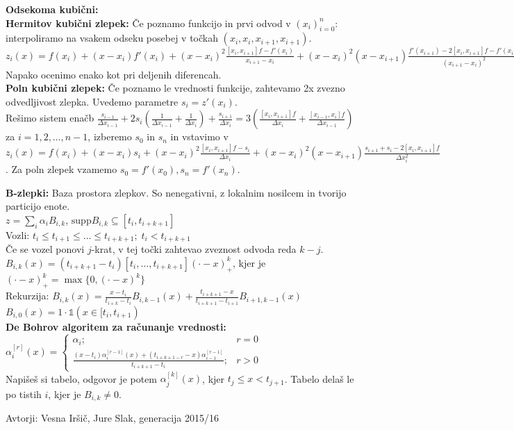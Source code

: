 \documentclass[a4paper,12pt]{article}
\theoremstyle{definition}
\begin{document}
\textbf{Odsekoma kubični:}\\
\textbf{Hermitov kubični zlepek:} Če poznamo funkcijo in prvi odvod v
$(x_i)_{i=0}^n$: interpoliramo na vsakem odseku posebej v
točkah $(x_i, x_i, x_{i+1}, x_{i+1})$.\\
$z_i(x) = f(x_i) + (x-x_i) f'(x_i) + (x-x_i)^2 \frac{[x_i, x_{i+1}]f -
f'(x_i)}{x_{i+1} - x_i} + (x-x_i)^2 (x-x_{i+1}) \frac{f'(x_{i+1}) - 2 [x_i,
x_{i+1}]f - f'(x_i)}{(x_{i+1} - x_i)^2}$\\
Napako ocenimo enako kot pri deljenih diferencah.\\
\textbf{Poln kubični zlepek:} Če poznamo le vrednosti funkcije, zahtevamo 2x
zvezno odvedljivost zlepka. Uvedemo parametre $s_i = z'(x_i)$. \\
Rešimo sistem enačb $\frac{s_{i-1}}{\Delta x_{i-1}} + 2 s_i
\left(\frac{1}{\Delta x_{i-1}} + \frac{1}{\Delta x_i}\right) +
\frac{s_{i+1}}{\Delta x_i} = 3\left(\frac{[x_i, x_{i+1}]f}{\Delta x_i} +
\frac{[x_{i-1}, x_i]f}{\Delta x_{i-1}}\right)$ za $i=1,2,\ldots,n-1$, izberemo
$s_0$ in $s_n$ in vstavimo v $z_i(x) = f(x_i) + (x-x_i)s_i +
(x-x_i)^2\frac{[x_i, x_{i+1}]f - s_i}{\Delta x_i} +
(x-x_i)^2(x-x_{i+1})\frac{s_{i+1} + s_i - 2[x_i, x_{i+1}]f}{\Delta x_i^2}$. Za
poln zlepek vzamemo $s_0 = f'(x_0), s_n = f'(x_n)$.

\textbf{B-zlepki:} Baza prostora zlepkov. So nenegativni, z lokalnim nosilcem
in tvorijo particijo enote.\\
$z = \sum_i \alpha_i B_{i,k}$, $\text{supp} B_{i,k} \subseteq [t_i, t_{i+k+1}]$\\
Vozli: $t_i \leq t_{i+1} \leq \ldots \leq t_{i+k+1}; \; t_i < t_{i+k+1}$\\
Če se vozel ponovi $j$-krat, v tej točki zahtevao zveznost odvoda reda $k-j$.\\
$B_{i,k} (x) = (t_{i+k+1} - t_i) [t_i, \ldots, t_{i+k+1}](\cdot - x)_+^k$, kjer
je $(\cdot - x)_+^k = \max\{0, (\cdot - x)^k\}$\\ Rekurzija: $B_{i,k}(x) =
\frac{x-t_i}{t_{i+k}-t_i} B_{i, k-1} (x) + \frac{t_{i+k+1} - x}{t_{i+k+1} -
t_{i+1}} B_{i+1, k-1} (x)$\\ $B_{i,0} (x) = 1 \cdot \mathbb{1}(x \in [t_i,
t_{i+1})$\\ \textbf{De Bohrov algoritem za računanje vrednosti:}
$\alpha_i^{[r]} (x) =
\begin{cases}
\alpha_i ;& r = 0\\
\frac{(x-t_i) \alpha_i^{[r-1]} (x) + (t_{i+k+1-r} - x) \alpha_{i-1}^{[r-1]}}{t_{i+k+1} - t_i};& r > 0
\end{cases}$\\
Napišeš si tabelo, odgovor je potem $\alpha_j^{[k]}(x)$, kjer $t_j \leq x <
t_{j+1}$. Tabelo delaš le po tistih $i$, kjer je $B_{i,k} \neq 0$. %

\hspace*{\fill} Avtorji: Vesna Iršič, Jure Slak, generacija 2015/16
\end{document}
